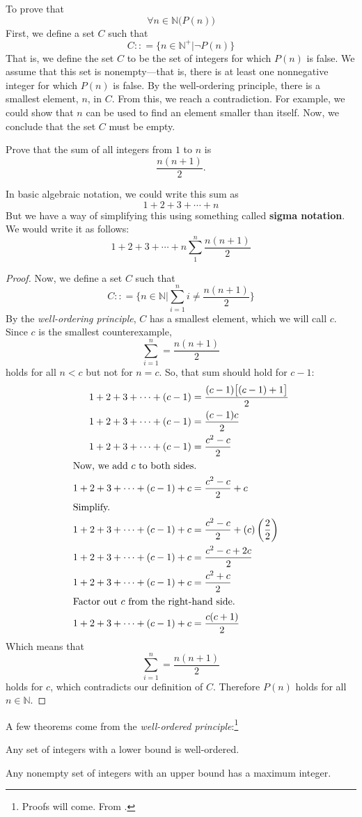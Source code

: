 To prove that
\[ \forall n \in \mathbb N \big( P(n)\big) \]
First, we define a set $C$ such that
\[ C : : = \big\{ n \in \mathbb N^+ \big| \neg P(n) \big\} \]
That is, we define the set $C$ to be the set of integers for which $P(n)$ is 
false.
We assume that this set is nonempty---that is, there is at least one nonnegative 
integer for which $P(n)$ is false.
By the well-ordering principle, there is a smallest element, $n$, in $C$.
From this, we reach a contradiction.
For example, we could show that $n$ can be used to find an element smaller than 
itself.
Now, we conclude that the set $C$ must be empty.

\begin{ex}
  Prove that the sum of all integers from $1$ to $n$ is \[\frac{n(n+1)}{2}.\]

  In basic algebraic notation, we could write this sum as
  \[1 + 2 + 3 + \cdots + n \]
  But we have a way of simplifying this using something called 
  \textbf{sigma notation}.
  We would write it as follows:
  \[1+2+3+\cdots+n  \sum_{1}^n \frac{n(n+1)}{2} \]
  \begin{proof}
    Now, we define a set $C$ such that
    \[ C : : = \bigg\{ n \in \mathbb N \big| \sum_{i=1}^n i \neq 
        \frac{n(n+1)}{2}\bigg\}
    \]
    By the \emph{well-ordering principle}, $C$ has a smallest element, which we 
    will call $c$.
    Since $c$ is the smallest counterexample,
    \[\sum_{i=1}^n = \frac{n(n+1)}{2}\]
    holds for all $n<c$ but not for $n=c$. So, that sum should hold for $c-1$:
    \begin{align*}
      1+2+3+\cdots+(c-1)&=\frac{(c-1)\big[(c-1)+1\big]}{2}\\
      1+2+3+\cdots+(c-1)&=\frac{(c-1)c}{2}\\
      1+2+3+\cdots+(c-1)&=\frac{c^2-c}{2}\\
      \intertext{Now, we add $c$ to both sides.}
      1+2+3+\cdots+(c-1)+c&=\frac{c^2-c}{2}+c\\
      \intertext{Simplify.}
      1+2+3+\cdots+(c-1)+c&=\frac{c^2-c}{2}+(c)\left(\frac{2}{2}\right)\\
      1+2+3+\cdots+(c-1)+c&=\frac{c^2-c+2c}{2} \\
      1+2+3+\cdots+(c-1)+c&=\frac{c^2+c}{2} \\
      \intertext{Factor out $c$ from the right-hand side.}
      1+2+3+\cdots+(c-1)+c&=\frac{c(c+1)}{2} \\
    \end{align*}
    Which means that
    \[\sum_{i=1}^n = \frac{n(n+1)}{2}\]
    holds for $c$, which contradicts our definition of $C$. Therefore $P(n)$ 
    holds for all  $n \in \mathbb N$.
  \end{proof}
\cite{mcsfull}
\end{ex}

A few theorems come from the \emph{well-ordered principle}:\footnote{Proofs will come. From \cite[29]{mcsfull}.}
\begin{theorem}
  Any set of integers with a lower bound is well-ordered.
\end{theorem}
\begin{theorem}
  Any nonempty set of integers with an upper bound has a maximum integer.
\end{theorem}
